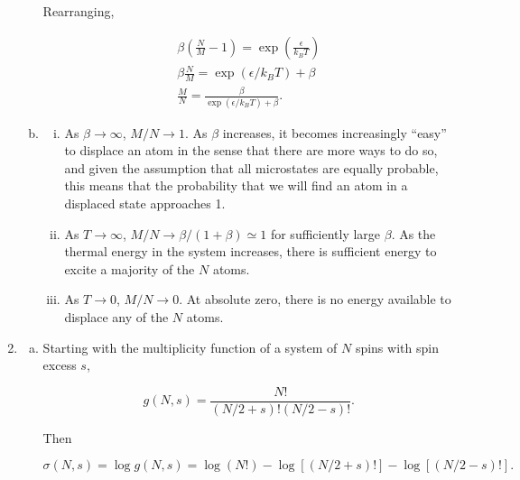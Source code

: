 \documentclass{article}
\begin{document}
\begin{enumerate}
\begin{enumerate}[(a)]
		Rearranging,

		\begin{gather*}
		\beta \left( \frac{N}{M} - 1 \right) = \exp \left( \frac{\epsilon}{k_B T} \right) \\
		\beta \frac{N}{M} = \exp ( \epsilon / k_B T) + \beta \\
		\frac{M}{N} = \frac{\beta}{\exp ( \epsilon / k_B T) + \beta }.
		\end{gather*}

		\item

		\begin{enumerate}[i)]

			\item

			As $\beta \to \infty$, $M/N \to 1$. As $\beta$ increases, it becomes increasingly ``easy'' to displace an atom in the sense that there are more ways to do so, and given the assumption that all microstates are equally probable, this means that the probability that we will find an atom in a displaced state approaches 1.

			\item

			As $T \to \infty$, $M/N \to \beta/(1 + \beta) \simeq 1$ for sufficiently large $\beta$. As the thermal energy in the system increases, there is sufficient energy to excite a majority of the $N$ atoms.

			\item

			As $T \to 0$, $M/N \to 0$. At absolute zero, there is no energy available to displace any of the $N$ atoms.

		\end{enumerate}

	\end{enumerate}

	\item

	\begin{enumerate}[(a)]

		\item

		Starting with the multiplicity function of a system of $N$ spins with spin excess $s$,

		$$g(N,s) = \frac{N!}{(N/2 + s)! (N/2 - s)!}.$$

		Then

		$$\sigma(N, s) = \log g(N,s) = \log (N!) - \log [(N/2 + s)!] -  \log [(N/2 - s)!].$$


\end{enumerate}
\end{enumerate}
\end{document}
